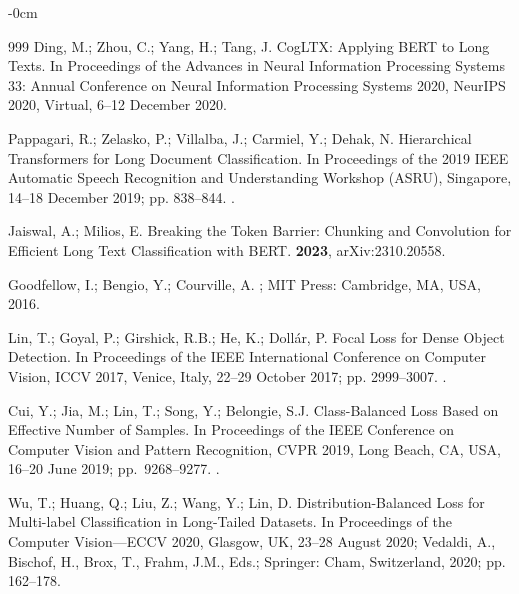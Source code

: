 \documentclass[make,article,accept,pdftex,moreauthors]{Definitions/mdpi}
\begin{document}
\begin{adjustwidth}{-\extralength}{0cm}
\begin{thebibliography}{999}
Ding, M.; Zhou, C.; Yang, H.; Tang, J.
\newblock CogLTX: Applying {BERT} to Long Texts.
\newblock In Proceedings of the Advances in Neural Information Processing
  Systems 33: Annual Conference on Neural Information Processing Systems 2020, NeurIPS 2020, Virtual,
  6--12 December 2020.

Pappagari, R.; Zelasko, P.; Villalba, J.; Carmiel, Y.; Dehak, N.
\newblock Hierarchical Transformers for Long Document Classification.
\newblock In Proceedings of the 2019 IEEE Automatic Speech Recognition and
  Understanding Workshop (ASRU), Singapore, 14--18 December 2019; pp. 838--844.
.

Jaiswal, A.; Milios, E.
\newblock Breaking the Token Barrier: Chunking and Convolution for Efficient
  Long Text Classification with BERT.
 {\bf 2023}, arXiv:2310.20558.

Goodfellow, I.; Bengio, Y.; Courville, A.
; MIT Press: Cambridge, MA, USA, 2016.

Lin, T.; Goyal, P.; Girshick, R.B.; He, K.; Doll{\'{a}}r, P.
\newblock Focal Loss for Dense Object Detection.
\newblock In Proceedings of the {IEEE} International Conference on Computer
  Vision, {ICCV} 2017, Venice, Italy, 22--29 October 2017;
 pp. 2999--3007.
.

Cui, Y.; Jia, M.; Lin, T.; Song, Y.; Belongie, S.J.
\newblock Class-Balanced Loss Based on Effective Number of Samples.
\newblock In Proceedings of the {IEEE} Conference on Computer Vision and
  Pattern Recognition, {CVPR} 2019, Long Beach, CA, USA, 16--20 June 2019; \mbox{pp. 9268--9277.}
.

Wu, T.; Huang, Q.; Liu, Z.; Wang, Y.; Lin, D.
\newblock Distribution-Balanced Loss for Multi-label Classification in
  Long-Tailed Datasets.
\newblock In Proceedings of the Computer Vision---ECCV 2020, Glasgow, UK, 23--28 August 2020; Vedaldi, A.,
  Bischof, H., Brox, T., Frahm, J.M., Eds.; Springer: Cham, Switzerland, 2020; pp. 162--178.


\end{thebibliography}
\end{adjustwidth}
\end{document}
